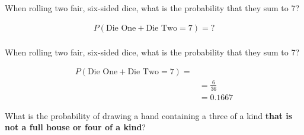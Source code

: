 %
\begin{frame}

When rolling two fair, six-sided dice, what is the probability that they sum to 7?

\begin{align*}
P(\text{Die One} + \text{Die Two} = 7) =?\\
\end{align*}

\end{frame}
%

%
\begin{frame}

When rolling two fair, six-sided dice, what is the probability that they sum to 7?

\begin{align*}
P(\text{Die One} + \text{Die Two} = 7) = \\
&=\frac{6}{36}\\
&=0.1667 
\end{align*}

\end{frame}
%

%
\begin{frame}

What is the probability of drawing a hand containing a three of a kind \textbf{that is
not a full house or four of a kind}?


\end{frame}
